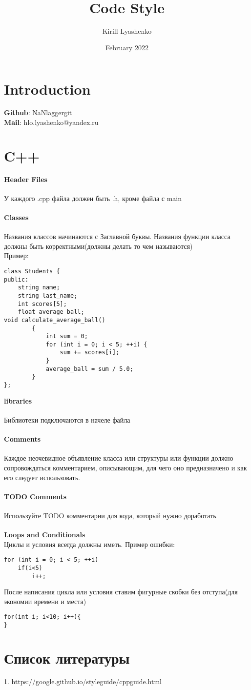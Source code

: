\documentclass{article}
\title{Code Style}
\author{Kirill Lyashenko }
\date{February 2022}
\begin{document}
\maketitle

\section{Introduction}
\textbf{Github}: NaNlaggergit
\\\textbf{Mail}: hlo.lyashenko@yandex.ru
\section{C++}
\textbf{Header Files}
\\
\\У каждого .cpp файла должен быть .h, кроме файла с main
\\
\\\textbf{Classes}
\\
\\Названия классов начинаются с Заглавной буквы. Названия функции класса должны быть корректными(должны делать то чем называются) 
\\Пример:
\begin{lstlisting}
class Students {
public:
    string name;
    string last_name;
    int scores[5]; 
    float average_ball;
void calculate_average_ball()
        {
            int sum = 0;
            for (int i = 0; i < 5; ++i) {
                sum += scores[i];
            }
            average_ball = sum / 5.0;
        }
};
\end{lstlisting}
\textbf{libraries}
\\
\\Библиотеки подключаются в начеле файла
\\
\\\textbf{Comments}
\\
\\Каждое неочевидное объявление класса или структуры или функции должно сопровождаться комментарием, описывающим, для чего оно предназначено и как его следует использовать.
\\
\\\textbf{TODO Comments}
\\
\\Используйте TODO комментарии для кода, который нужно доработать 
\\
\\\textbf{Loops and Conditionals}
\\Циклы и условия всегда должны иметь{}.
Пример ошибки:
\begin{lstlisting}
for (int i = 0; i < 5; ++i) 
    if(i<5)
        i++;
\end{lstlisting}
После написания цикла или условия ставим фигурные скобки без отступа(для экономии времени и места)
\begin{lstlisting}
for(int i; i<10; i++){
}
\end{lstlisting}
\section{Список литературы}
1. https://google.github.io/styleguide/cppguide.html
\end{document}

